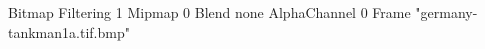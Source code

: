 {Bitmap
	{Filtering 1}
	{Mipmap 0}
	{Blend none}
	{AlphaChannel 0}
	{Frame "germany-tankman1a.tif.bmp"}
}
